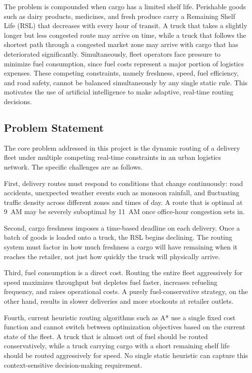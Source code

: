 The problem is compounded when cargo has a limited shelf life. Perishable goods
such as dairy products, medicines, and fresh produce carry a Remaining Shelf Life
(RSL) that decreases with every hour of transit. A truck that takes a slightly
longer but less congested route may arrive on time, while a truck that follows the
shortest path through a congested market zone may arrive with cargo that has
deteriorated significantly. Simultaneously, fleet operators face pressure to
minimize fuel consumption, since fuel costs represent a major portion of logistics
expenses. These competing constraints, namely freshness, speed, fuel efficiency,
and road safety, cannot be balanced simultaneously by any single static rule. This
motivates the use of artificial intelligence to make adaptive, real-time routing
decisions.

\subsection{Problem Statement}

The core problem addressed in this project is the dynamic routing of a delivery
fleet under multiple competing real-time constraints in an urban logistics network.
The specific challenges are as follows.

First, delivery routes must respond to conditions that change continuously: road
accidents, unexpected weather events such as monsoon rainfall, and fluctuating
traffic density across different zones and times of day. A route that is optimal
at 9~AM may be severely suboptimal by 11~AM once office-hour congestion sets in.

Second, cargo freshness imposes a time-based deadline on each delivery. Once a
batch of goods is loaded onto a truck, the RSL begins declining. The routing
system must factor in how much freshness a cargo will have remaining when it
reaches the retailer, not just how quickly the truck will physically arrive.

Third, fuel consumption is a direct cost. Routing the entire fleet aggressively
for speed maximizes throughput but depletes fuel faster, increases refueling
frequency, and raises operational costs. A purely fuel-conservative strategy, on
the other hand, results in slower deliveries and more stockouts at retailer outlets.

Fourth, current heuristic routing algorithms such as A* use a single fixed cost
function and cannot switch between optimization objectives based on the current
state of the fleet. A truck that is almost out of fuel should be routed
conservatively, while a truck carrying cargo with a short remaining shelf life
should be routed aggressively for speed. No single static heuristic can capture
this context-sensitive decision-making requirement.

